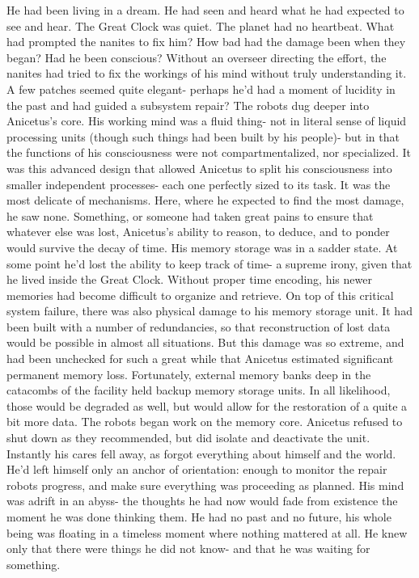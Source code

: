 \documentclass[a4paper]{article}
\begin{document}
He had been living in a dream. He had seen and heard what he had expected to see and hear. The Great Clock was quiet. The planet had no heartbeat.
What had prompted the nanites to fix him? How bad had the damage been when they began? Had he been conscious? Without an overseer directing the effort, the nanites had tried to fix the workings of his mind without truly understanding it. A few patches seemed quite elegant- perhaps he’d had a moment of lucidity in the past and had guided a subsystem repair?
The robots dug deeper into Anicetus’s core. His working mind was a fluid thing- not in literal sense of liquid processing units (though such things had been built by his people)- but in that the functions of his consciousness were not compartmentalized, nor specialized. It was this advanced design that allowed Anicetus to split his consciousness into smaller independent processes- each one perfectly sized to its task. It was the most delicate of mechanisms. Here, where he expected to find the most damage, he saw none. Something, or someone had taken great pains to ensure that whatever else was lost, Anicetus’s ability to reason, to deduce, and to ponder would survive the decay of time.
His memory storage was in a sadder state. At some point he’d lost the ability to keep track of time- a supreme irony, given that he lived inside the Great Clock. Without proper time encoding, his newer memories had become difficult to organize and retrieve. On top of this critical system failure, there was also physical damage to his memory storage unit. It had been built with a number of redundancies, so that reconstruction of lost data would be possible in almost all situations. But this damage was so extreme, and had been unchecked for such a great while that Anicetus estimated significant permanent memory loss. Fortunately, external memory banks deep in the catacombs of the facility held backup memory storage units. In all likelihood, those would be degraded as well, but would allow for the restoration of a quite a bit more data.
The robots began work on the memory core. Anicetus refused to shut down as they recommended, but did isolate and deactivate the unit. Instantly his cares fell away, as forgot everything about himself and the world. He’d left himself only an anchor of orientation: enough to monitor the repair robots progress, and make sure everything was proceeding as planned.
His mind was adrift in an abyss- the thoughts he had now would fade from existence the moment he was done thinking them. He had no past and no future, his whole being was floating in a timeless moment where nothing mattered at all. He knew only that there were things he did not know- and that he was waiting for something.
\end{document}
